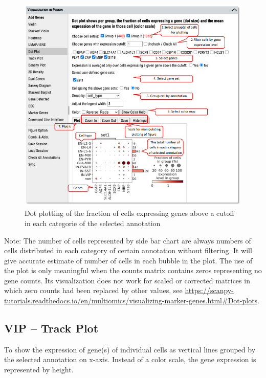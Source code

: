 \documentclass[
]{article}
\begin{document}
\begin{figure}
\centering
\includegraphics{figures/F11.jpg}
\caption{Dot plotting of the fraction of cells expressing genes above a cutoff in each categorie of the selected annotation}
\end{figure}

Note: The number of cells represented by side bar chart are always numbers of cells distributed in each category of certain annotation without filtering. It will give accurate estimate of number of cells in each bubble in the plot. The use of the plot is only meaningful when the counts matrix contains zeros representing no gene counts. Its visualization does not work for scaled or corrected matrices in which zero counts had been replaced by other values, see \url{https://scanpy-tutorials.readthedocs.io/en/multiomics/visualizing-marker-genes.html\#Dot-plots}.

\hypertarget{vip-track-plot}{%
\subsection{VIP -- Track Plot}\label{vip-track-plot}}

To show the expression of gene(s) of individual cells as vertical lines grouped by the selected annotation on x-axis. Instead of a color scale, the gene expression is represented by height.
\end{document}
